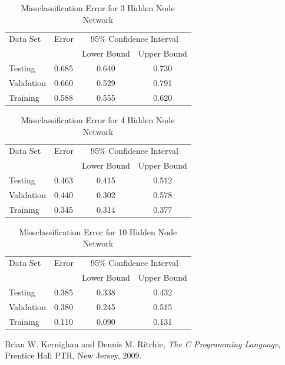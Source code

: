 \documentclass{article}
\begin{document}
\begin{table}
\caption{Missclassification Error for 3 Hidden Node Network}
\begin{center}
\begin{tabular}{llcc}
\toprule
Data Set & Error & \multicolumn{2}{c}{95\% Confidence Interval} \\
\cmidrule(r){3-4}
& & Lower Bound & Upper Bound \\
\midrule
Testing       & 0.685 &  0.640 & 0.730  \\
Validation    & 0.660 &  0.529 & 0.791  \\
Training      & 0.588 &  0.555 & 0.620  \\
\bottomrule
\end{tabular}
\label{table3}
\end{center}
\end{table}

\begin{table}
\caption{Missclassification Error for 4 Hidden Node Network}
\begin{center}
\begin{tabular}{llcc}
\toprule
Data Set & Error & \multicolumn{2}{c}{95\% Confidence Interval} \\
\cmidrule(r){3-4}
& & Lower Bound & Upper Bound \\
\midrule
Testing       & 0.463 &  0.415 & 0.512  \\
Validation    & 0.440 &  0.302 & 0.578  \\
Training      & 0.345 &  0.314 & 0.377  \\
\bottomrule
\end{tabular}
\label{table4}
\end{center}
\end{table}

\begin{table}
\caption{Missclassification Error for 10 Hidden Node Network}
\begin{center}
\begin{tabular}{llcc}
\toprule
Data Set & Error & \multicolumn{2}{c}{95\% Confidence Interval} \\
\cmidrule(r){3-4}
& & Lower Bound & Upper Bound \\
\midrule
Testing       & 0.385 &  0.338 & 0.432  \\
Validation    & 0.380 &  0.245 & 0.515  \\
Training      & 0.110 &  0.090 & 0.131  \\
\bottomrule
\end{tabular}
\label{table10}
\end{center}
\end{table}

\begin{thebibliography}{9}

  Brian W. Kernighan and Dennis M. Ritchie,
  \emph{The C Programming Language},
  Prentice Hall PTR, New Jersey,
  2009.

\end{thebibliography}
\end{document}

